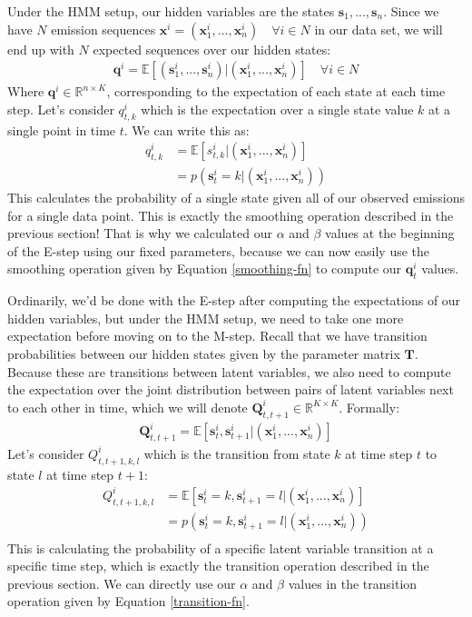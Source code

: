 Under the HMM setup, our hidden variables are the states $\textbf{s}_1, ..., \textbf{s}_n$. Since we have $N$ emission sequences $\textbf{x}^i = (\textbf{x}_1^i, ..., \textbf{x}_n^i) \quad \forall i \in N$ in our data set, we will end up with $N$ expected sequences over our hidden states:
\begin{align*}
	\textbf{q}^i = \mathbb{E}[(\textbf{s}_1^i, ..., \textbf{s}_n^i) | (\textbf{x}_1^i, ..., \textbf{x}_n^i)] \quad \forall i \in N
\end{align*}
Where $\textbf{q}^i \in \mathbb{R}^{n \times K}$, corresponding to the expectation of each state at each time step. Let's consider $q_{t, k}^i$ which is the expectation over a single state value $k$ at a single point in time $t$. We can write this as:
\begin{align}
	q_{t, k}^i &= \mathbb{E}[s_{t, k}^i | (\textbf{x}_1^i, ..., \textbf{x}_n^i)] \\
	&= p(\textbf{s}_{t}^i = k | (\textbf{x}_1^i, ..., \textbf{x}_n^i))
\end{align}
This calculates the probability of a single state given all of our observed emissions for a single data point. This is exactly the smoothing operation described in the previous section! That is why we calculated our $\alpha$ and $\beta$ values at the beginning of the E-step using our fixed parameters, because we can now easily use the smoothing operation given by Equation \ref{smoothing-fn} to compute our $\textbf{q}_t^i$ values.

Ordinarily, we'd be done with the E-step after computing the expectations of our hidden variables, but under the HMM setup, we need to take one more expectation before moving on to the M-step. Recall that we have transition probabilities between our hidden states given by the parameter matrix $\textbf{T}$. Because these are transitions between latent variables, we also need to compute the expectation over the joint distribution between pairs of latent variables next to each other in time, which we will denote $\textbf{Q}_{t, t+1}^i \in \mathbb{R}^{K \times K}$. Formally:
\begin{align}
	\textbf{Q}_{t, t+1}^i = \mathbb{E}[\textbf{s}_t^i, \textbf{s}_{t+1}^i | (\textbf{x}_1^i, ..., \textbf{x}_n^i)]
\end{align}
Let's consider $Q_{t, t+1, k, l}^i$ which is the transition from state $k$ at time step $t$ to state $l$ at time step $t+1$:
\begin{align}
	Q_{t, t+1, k, l}^i &= \mathbb{E}[\textbf{s}_{t}^i = k, \textbf{s}_{t+1}^i = l | (\textbf{x}_1^i, ..., \textbf{x}_n^i)] \\
	&= p(\textbf{s}_{t}^i = k, \textbf{s}_{t+1}^i = l | (\textbf{x}_1^i, ..., \textbf{x}_n^i)) \\
\end{align}
This is calculating the probability of a specific latent variable transition at a specific time step, which is exactly the transition operation described in the previous section. We can directly use our $\alpha$ and $\beta$ values in the transition operation given by Equation \ref{transition-fn}.

